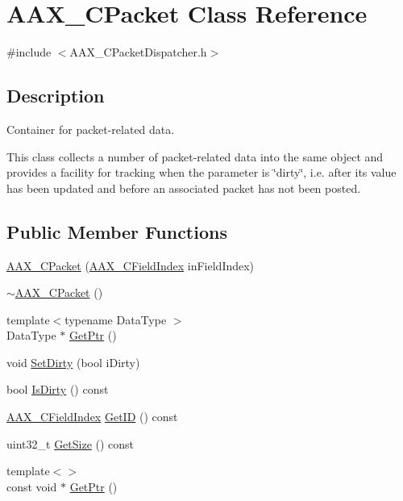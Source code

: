 \hypertarget{a00030}{}\section{A\+A\+X\+\_\+\+C\+Packet Class Reference}
\label{a00030}


{\ttfamily \#include $<$A\+A\+X\+\_\+\+C\+Packet\+Dispatcher.\+h$>$}



\subsection{Description}
Container for packet-\/related data. 

This class collects a number of packet-\/related data into the same object and provides a facility for tracking when the parameter is \char`\"{}dirty\char`\"{}, i.\+e. after its value has been updated and before an associated packet has not been posted. \subsection*{Public Member Functions}
\begin{DoxyCompactItemize}
\item 
\hyperlink{a00030_aff3be2253e450887b07a519c84fe47e2}{A\+A\+X\+\_\+\+C\+Packet} (\hyperlink{a00149_ae807f8986143820cfb5d6da32165c9c7}{A\+A\+X\+\_\+\+C\+Field\+Index} in\+Field\+Index)
\item 
\hyperlink{a00030_ac0dc6c7d54d3e2d8b2717dcc55be839e}{$\sim$\+A\+A\+X\+\_\+\+C\+Packet} ()
\item 
{\footnotesize template$<$typename Data\+Type $>$ }\\Data\+Type $\ast$ \hyperlink{a00030_a4f9bbeedcad126dd34e797ac4c8fc736}{Get\+Ptr} ()
\item 
void \hyperlink{a00030_a43449a06b1c20f85b90560ec30057570}{Set\+Dirty} (bool i\+Dirty)
\item 
bool \hyperlink{a00030_ab4df0365b4e420dad972582b9aea4fa2}{Is\+Dirty} () const 
\item 
\hyperlink{a00149_ae807f8986143820cfb5d6da32165c9c7}{A\+A\+X\+\_\+\+C\+Field\+Index} \hyperlink{a00030_aa2a93175b06f12a62f5cb3101126b8f3}{Get\+I\+D} () const 
\item 
uint32\+\_\+t \hyperlink{a00030_ad1a948ee92e899bf970f2cc3522ed45e}{Get\+Size} () const 
\item 
{\footnotesize template$<$$>$ }\\const void $\ast$ \hyperlink{a00030_a14cb7e34d64f05dd57ff8b903602f32b}{Get\+Ptr} ()
\end{DoxyCompactItemize}


